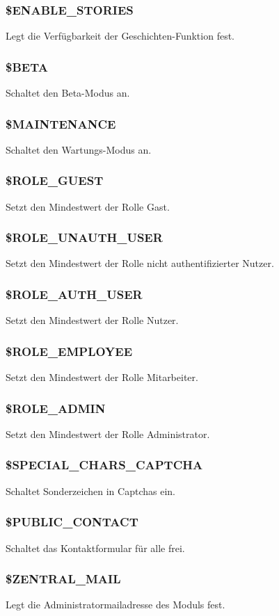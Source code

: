 \subsubsection{\$ENABLE\_STORIES} Legt die Verfügbarkeit der Geschichten-Funktion fest.
\subsubsection{\$BETA} Schaltet den Beta-Modus an.
\subsubsection{\$MAINTENANCE} Schaltet den Wartungs-Modus an.
\subsubsection{\$ROLE\_GUEST} Setzt den Mindestwert der Rolle {\glqq Gast\grqq}.
\subsubsection{\$ROLE\_UNAUTH\_USER} Setzt den Mindestwert der Rolle {\glqq nicht authentifizierter Nutzer\grqq}.
\subsubsection{\$ROLE\_AUTH\_USER} Setzt den Mindestwert der Rolle {\glqq Nutzer\grqq}.
\subsubsection{\$ROLE\_EMPLOYEE} Setzt den Mindestwert der Rolle {\glqq Mitarbeiter\grqq}.
\subsubsection{\$ROLE\_ADMIN} Setzt den Mindestwert der Rolle {\glqq Administrator\grqq}.
\subsubsection{\$SPECIAL\_CHARS\_CAPTCHA} Schaltet Sonderzeichen in Captchas ein.
\subsubsection{\$PUBLIC\_CONTACT} Schaltet das Kontaktformular für alle frei.
\subsubsection{\$ZENTRAL\_MAIL} Legt die Administratormailadresse des Moduls fest.
